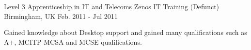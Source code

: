 

\begin{cventries}

	\cventry
	{Level 3 Apprenticeship in IT and Telecoms} %
	{Zenos IT Training (Defunct)} %
	{Birmingham, UK} %
	{Feb. 2011 - Jul 2011} %
	{
		\begin{cvitems} %
		\item {Gained knowledge about Desktop support and gained many qualifications such as A+, MCITP MCSA and MCSE qualifications.}
		\end{cvitems}
	}

\end{cventries}
